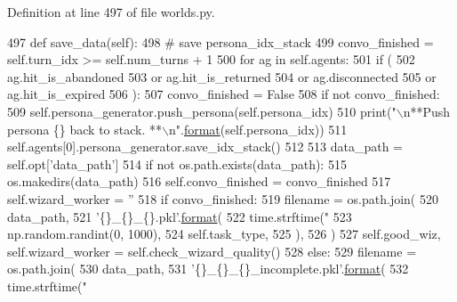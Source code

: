 Definition at line 497 of file worlds.\+py.


\begin{DoxyCode}
497     \textcolor{keyword}{def }save\_data(self):
498         \textcolor{comment}{# save persona\_idx\_stack}
499         convo\_finished = self.turn\_idx >= self.num\_turns + 1
500         \textcolor{keywordflow}{for} ag \textcolor{keywordflow}{in} self.agents:
501             \textcolor{keywordflow}{if} (
502                 ag.hit\_is\_abandoned
503                 \textcolor{keywordflow}{or} ag.hit\_is\_returned
504                 \textcolor{keywordflow}{or} ag.disconnected
505                 \textcolor{keywordflow}{or} ag.hit\_is\_expired
506             ):
507                 convo\_finished = \textcolor{keyword}{False}
508         \textcolor{keywordflow}{if} \textcolor{keywordflow}{not} convo\_finished:
509             self.persona\_generator.push\_persona(self.persona\_idx)
510             print(\textcolor{stringliteral}{"\(\backslash\)n**Push persona \{\} back to stack. **\(\backslash\)n"}.\hyperlink{namespaceparlai_1_1chat__service_1_1services_1_1messenger_1_1shared__utils_a32e2e2022b824fbaf80c747160b52a76}{format}(self.persona\_idx))
511         self.agents[0].persona\_generator.save\_idx\_stack()
512 
513         data\_path = self.opt[\textcolor{stringliteral}{'data\_path'}]
514         \textcolor{keywordflow}{if} \textcolor{keywordflow}{not} os.path.exists(data\_path):
515             os.makedirs(data\_path)
516         self.convo\_finished = convo\_finished
517         self.wizard\_worker = \textcolor{stringliteral}{''}
518         \textcolor{keywordflow}{if} convo\_finished:
519             filename = os.path.join(
520                 data\_path,
521                 \textcolor{stringliteral}{'\{\}\_\{\}\_\{\}.pkl'}.\hyperlink{namespaceparlai_1_1chat__service_1_1services_1_1messenger_1_1shared__utils_a32e2e2022b824fbaf80c747160b52a76}{format}(
522                     time.strftime(\textcolor{stringliteral}{"%
523                     np.random.randint(0, 1000),
524                     self.task\_type,
525                 ),
526             )
527             self.good\_wiz, self.wizard\_worker = self.check\_wizard\_quality()
528         \textcolor{keywordflow}{else}:
529             filename = os.path.join(
530                 data\_path,
531                 \textcolor{stringliteral}{'\{\}\_\{\}\_\{\}\_incomplete.pkl'}.\hyperlink{namespaceparlai_1_1chat__service_1_1services_1_1messenger_1_1shared__utils_a32e2e2022b824fbaf80c747160b52a76}{format}(
532                     time.strftime(\textcolor{stringliteral}{"%
}}
\end{DoxyCode}
